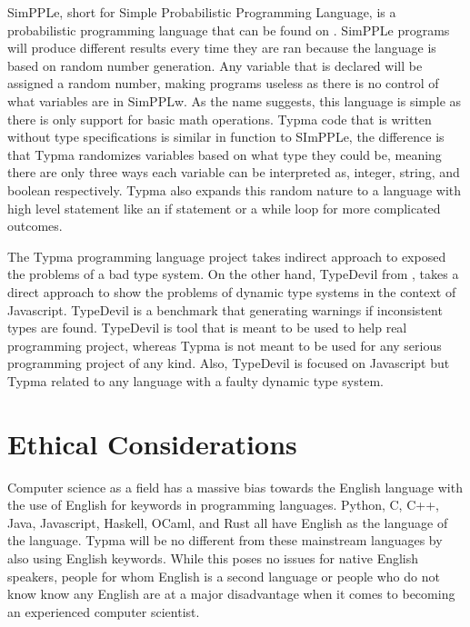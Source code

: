 \documentclass[10pt,twocolumn]{article}
\begin{document}
SimPPLe, short for Simple Probabilistic Programming Language, is a probabilistic programming language that can be found on \textcite{SimPPLe}. SimPPLe programs will produce different results every time they are ran because the language is based on random number generation. Any variable that is declared will be assigned a random number, making programs useless as there is no control of what variables are in SimPPLw. As the name suggests, this language is simple as there is only support for basic math operations. Typma code that is written without type specifications is similar in function to SImPPLe, the difference is that Typma randomizes variables based on what type they could be, meaning there are only three ways each variable can be interpreted as, integer, string, and boolean respectively. Typma also expands this random nature to a language with high level statement like an if statement or a while loop for more complicated outcomes.

The Typma programming language project takes indirect approach to exposed the problems of a bad type system. On the other hand, TypeDevil from \textcite{Pradel2014TypeDevil}, takes a direct approach to show the problems of dynamic type systems in the context of Javascript. TypeDevil is a benchmark that generating warnings if inconsistent types are found. TypeDevil is tool that is meant to be used to help real programming project, whereas Typma is not meant to be used for any serious programming project of any kind. Also, TypeDevil is focused on Javascript but Typma related to any language with a faulty dynamic type system. 

\section{Ethical Considerations}

Computer science as a field has a massive bias towards the English language with the use of English for keywords in programming languages. Python, C, C++, Java, Javascript, Haskell, OCaml, and Rust all have English as the language of the language. Typma will be no different from these mainstream languages by also using English keywords. While this poses no issues for native English speakers, people for whom English is a second language or people who do not know know any English are at a major disadvantage when it comes to becoming an experienced computer scientist. 
\end{document}
